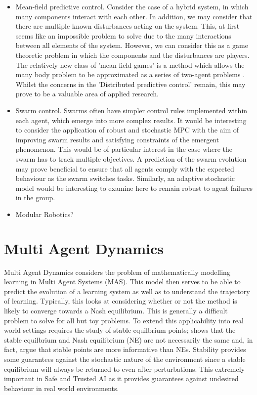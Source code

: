 \documentclass[preprint,11pt]{report}
\begin{document}
\begin{itemize}
	\item Mean-field predictive control. Consider the case of a hybrid system, in which many components
	interact with each other. In addition, we may consider that there are multiple known disturbances
	acting on the system. This, at first seems like an impossible problem to solve due to the many
	interactions between all elements of the system. However, we can consider this as a game
	theoretic problem in which the components and the disturbances are players. The relatively new
	class of 'mean-field games' is a method which allows the many body problem to be approximated as
	a series of two-agent problems \cite{Yang2018}. Whilst the concerns in the 'Distributed
	predictive control' remain, this may prove to be a valuable area of applied research.
	\item Swarm control. Swarms often have simpler control rules implemented within each agent,
	which emerge into more complex results. It would be interesting to consider the application of
	robust and stochastic MPC with the aim of improving swarm results and satisfying constraints of
	the emergent phenomenon. This would be of particular interest in the case where the swarm has to
	track multiple objectives. A prediction of the swarm evolution may prove beneficial to ensure
	that all agents comply with the expected behaviour as the swarm switches tasks. Similarly, an
	adaptive stochastic model would be interesting to examine here to remain robust to agent
	failures in the group.
	\item Modular Robotics?
\end{itemize}

\section*{Multi Agent Dynamics}

Multi Agent Dynamics considers the problem of mathematically modelling learning in Multi Agent
Systems (MAS). This model then serves to be able to predict the evolution of a learning system as
well as to understand the trajectory of learning. Typically, this looks at considering whether or
not the method is likely to converge towards a Nash equilibrium. This is generally a difficult
problem to solve \cite{ShohamMultiagentFoundations} for all but toy problems. To extend this
applicability into real world settings requires the study of stable equilbrium points;
\cite{Letcher2019DifferentiableMechanics} shows that the stable equilbrium and Nash equilibrium (NE)
are not necessarily the same and, in fact, argue that stable points are more informative than NEs.
Stability provides some guarantees against the stochastic nature of the environment since a stable
equilibrium will always be returned to even after perturbations. This extremely important in Safe
and Trusted AI as it provides guarantees against undesired behaviour in real world
environments. 
\end{document}
